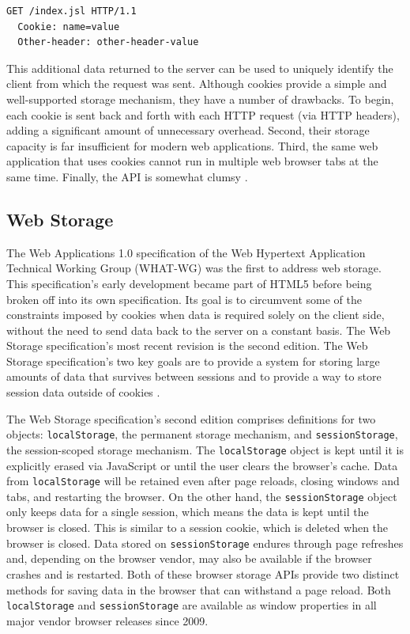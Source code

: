 \begin{lstlisting}[language={}, caption={Cookie HTTP header}]
  GET /index.jsl HTTP/1.1
  Cookie: name=value
  Other-header: other-header-value
\end{lstlisting}

This additional data returned to the server can be used to uniquely identify the client from which the request was sent. Although cookies provide a simple and well-supported storage mechanism, they have a number of drawbacks. To begin, each cookie is sent back and forth with each HTTP request (via HTTP headers), adding a significant amount of unnecessary overhead. Second, their storage capacity is far insufficient for modern web applications. Third, the same web application that uses cookies cannot run in multiple web browser tabs at the same time. Finally, the API is somewhat clumsy \autocite{kessin2011programming, macdonald2013html5}.

\subsection*{Web Storage}
The Web Applications 1.0 specification of the Web Hypertext Application Technical Working Group (WHAT-WG) was the first to address web storage. This specification's early development became part of HTML5 before being broken off into its own specification. Its goal is to circumvent some of the constraints imposed by cookies when data is required solely on the client side, without the need to send data back to the server on a constant basis. The Web Storage specification's most recent revision is the second edition. The Web Storage specification's two key goals are to provide a system for storing large amounts of data that survives between sessions and to provide a way to store session data outside of cookies \autocite{frisbie2019professional}.

The Web Storage specification's second edition comprises definitions for two objects: \texttt{localStorage}, the permanent storage mechanism, and \texttt{sessionStorage}, the session-scoped storage mechanism. The \texttt{localStorage} object is kept until it is explicitly erased via JavaScript or until the user clears the browser's cache. Data from \texttt{localStorage} will be retained even after page reloads, closing windows and tabs, and restarting the browser. On the other hand, the \texttt{sessionStorage} object only keeps data for a single session, which means the data is kept until the browser is closed. This is similar to a session cookie, which is deleted when the browser is closed. Data stored on \texttt{sessionStorage} endures through page refreshes and, depending on the browser vendor, may also be available if the browser crashes and is restarted. Both of these browser storage APIs provide two distinct methods for saving data in the browser that can withstand a page reload. Both \texttt{localStorage} and \texttt{sessionStorage} are available as window properties in all major vendor browser releases since 2009.


